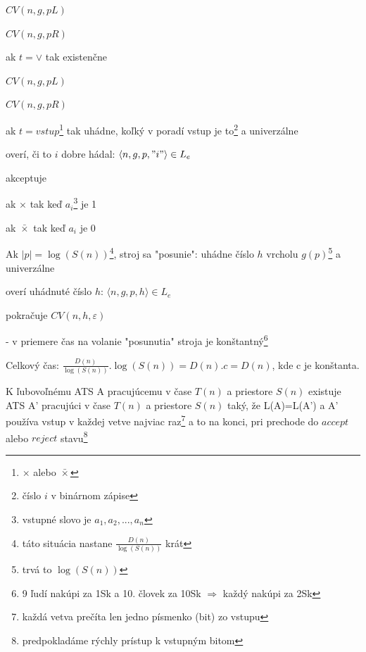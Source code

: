 \begin{dokaz}
\begin{description}
\begin{enumerate}
\begin{description}
\begin{description}
    \item $CV(n,g,pL)$
    \item $CV(n,g,pR)$
    \end{description}
    \item ak $t=\vee$ tak existenčne
    \begin{description}
    \item $CV(n,g,pL)$
    \item $CV(n,g,pR)$
    \end{description}
    \item ak $t=vstup$\footnote{$\times$ alebo $\bar{\times}$} tak uhádne, koľký v poradí
    vstup je to\footnote{číslo $i$ v binárnom zápise} a univerzálne
    \begin{description}
    \item overí, či to $i$ dobre hádal: $\langle n,g,p,"i"\rangle \in L_e$
    \item akceptuje
    \begin{description}
    \item ak $\times$ tak keď $a_i$\footnote{vstupné slovo je $a_1,a_2,...,a_n$} je 1
    \item ak $\bar{\times}$ tak keď $a_i$ je 0
    \end{description}
    \end{description}
    \end{description}
    \end{enumerate}
    Ak $|p|=\log(S(n))$\footnote{táto situácia nastane $\frac{D(n)}{\log(S(n))}$ krát}, stroj
    sa "posunie": uhádne číslo $h$ vrcholu $g(p)$\footnote{trvá to $\log(S(n))$} a
    univerzálne
    \begin{description}
    \item overí uhádnuté číslo $h$: $\langle n,g,p,h \rangle \in L_e$
    \item pokračuje $CV(n,h,\varepsilon)$
    \end{description}
    - v priemere čas na volanie "posunutia" stroja je konštantný\footnote{9 ľudí nakúpi za
    1Sk a 10. človek za 10Sk $\Rightarrow$ každý nakúpi za 2Sk}
  \end{description}
  Celkový čas: $\frac{D(n)}{\log(S(n))}.\log(S(n)) = D(n).c=D(n)$, kde c je konštanta.
\end{dokaz}

\begin{lema}
  K ľubovoľnému ATS A pracujúcemu v čase $T(n)$ a priestore $S(n)$ existuje ATS A'
  pracujúci v čase $T(n)$ a priestore $S(n)$ taký, že L(A)=L(A') a A' používa vstup v
  každej vetve najviac raz\footnote{každá vetva prečíta len jedno písmenko (bit) zo vstupu}
  a to na konci, pri prechode do $accept$ alebo $reject$ stavu\footnote{predpokladáme
  rýchly prístup k vstupným bitom}
\end{lema}

